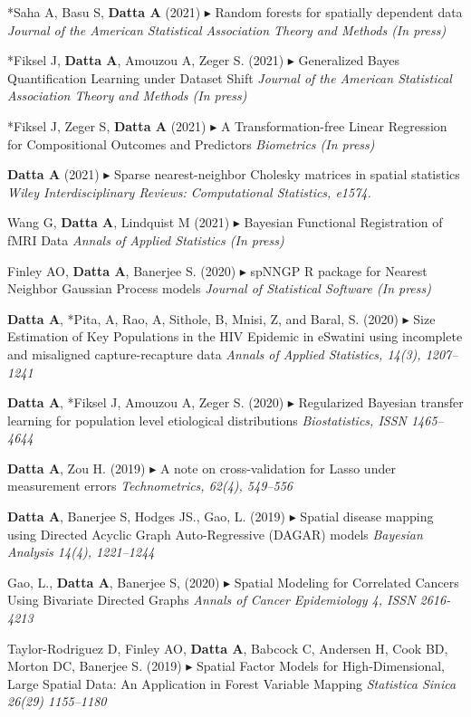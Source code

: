 \documentclass[12pt]{article}
\newcommand{\mine}{
  \addtocounter{enumi}{1}
\item[\fcolorbox{white}{grey}{\color{white} \tiny \arabic{enumi}}]
}
\newcommand{\dg}[1]{{\color{black} $\blacktriangleright$ {#1}}}
\begin{document}
\mine *Saha A, Basu S, \textbf{Datta A} (2021) {\dg Random forests for spatially dependent data} {\it Journal of the American Statistical Association Theory and Methods (In press)}

\mine *Fiksel J, \textbf{Datta A}, Amouzou A, Zeger S. (2021) {\dg Generalized Bayes Quantification Learning under Dataset Shift } {\it  Journal of the American Statistical Association Theory and Methods (In press)}

\mine *Fiksel J, Zeger S, \textbf{Datta A} (2021) {\dg A Transformation-free Linear Regression for Compositional Outcomes and Predictors} {\it Biometrics (In press)}

\mine \textbf{Datta A} (2021) {\dg Sparse nearest-neighbor Cholesky matrices in spatial statistics} {\it  Wiley Interdisciplinary Reviews: Computational
	Statistics, e1574.}

\item Wang G, \textbf{Datta A}, Lindquist M (2021) {\dg Bayesian Functional Registration of fMRI Data} {\it Annals of Applied Statistics (In press)}

\item Finley AO, \textbf{Datta A}, Banerjee S. (2020) {\dg spNNGP R package for Nearest Neighbor Gaussian Process models} {\it Journal of Statistical Software (In press)}

\mine \textbf{Datta A}, *Pita, A, Rao, A, Sithole, B, Mnisi, Z, and Baral, S. (2020)	{\dg Size Estimation of Key Populations in the HIV Epidemic in eSwatini using incomplete and misaligned capture-recapture data} {\it Annals of Applied Statistics, 14(3), 1207--1241 }

\mine \textbf{Datta A}, *Fiksel J, Amouzou A, Zeger S. (2020) {\dg Regularized Bayesian transfer learning for population level etiological
	distributions} {\it Biostatistics, ISSN 1465--4644}
\mine \textbf{Datta A}, Zou H. (2019) {\dg A note on cross-validation for Lasso under measurement
	errors} {\it Technometrics, 62(4), 549--556 }

\mine \textbf{Datta A}, Banerjee S, Hodges JS., Gao, L. (2019)  {\dg Spatial disease mapping using
	Directed Acyclic Graph Auto-Regressive (DAGAR) models} {\it Bayesian Analysis 14(4), 1221--1244}
\item Gao, L., \textbf{Datta A}, Banerjee S, (2020) {\dg Spatial Modeling for Correlated Cancers Using Bivariate Directed Graphs} {\it Annals of Cancer Epidemiology 	4, ISSN 2616-4213}

\item Taylor-Rodriguez D, Finley AO, \textbf{Datta A}, Babcock C, Andersen H, Cook BD,
Morton DC, Banerjee S. (2019)
{\dg Spatial Factor Models for High-Dimensional, Large Spatial Data: An Application in Forest Variable Mapping}
{\it Statistica Sinica 26(29) 1155--1180}
\end{document}
